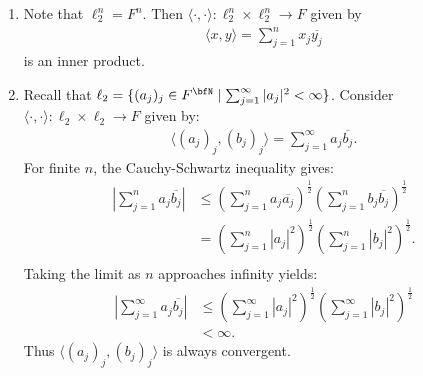     \begin{example}
        \phantom{a}
        \begin{enumerate}[label = (\arabic*)]
            \item Note that $\ell_2^n = F^n$. Then $\langle \cdot,\cdot \rangle: \ell_2^n \times \ell_2^n \rightarrow F$ given by
                \begin{equation*}
                \begin{split}
                    \langle x,y \rangle = \sum_{j = 1}^n x_j \overline{y_j}
                \end{split}
                \end{equation*}
            is an inner product.

            \item Recall that $\ell_2 = \{(a_j)_j \in F^\bfN \mid \sum_{j = 1}^\infty |a_j|^2 < \infty\}$. Consider $\langle \cdot,\cdot \rangle:\ell_2 \times \ell_2 \rightarrow F$ given by:
                \begin{equation*}
                \begin{split}
                    \langle (a_j)_j,(b_j)_j \rangle = \sum_{j = 1}^\infty a_j \overline{b_j}.
                \end{split}
                \end{equation*}
            For finite $n$, the Cauchy-Schwartz inequality gives:
                \begin{equation*}
                \begin{split}
                    \left| \sum_{j=1}^n a_j \overline{b_j} \right|
                    & \leq \left( \sum_{j = 1}^n a_j \overline{a_j} \right)^\frac{1}{2} \left( \sum_{j = 1}^n b_j \overline{b_j} \right)^\frac{1}{2} \\
                    & = \left( \sum_{j = 1}^n |a_j|^2 \right)^\frac{1}{2} \left( \sum_{j = 1}^n |b_j|^2 \right)^\frac{1}{2}. \\
                \end{split}
                \end{equation*}
            Taking the limit as $n$ approaches infinity yields:
                \begin{equation*}
                \begin{split}
                    \left| \sum_{j=1}^\infty a_j \overline{b_j} \right|
                    & \leq \left( \sum_{j = 1}^\infty |a_j|^2 \right)^\frac{1}{2} \left( \sum_{j = 1}^\infty |b_j|^2 \right)^\frac{1}{2} \\
                    & < \infty.
                \end{split}
                \end{equation*}
            Thus $\langle (a_j)_j,(b_j)_j \rangle$ is always convergent.
        \end{enumerate}
    \end{example}


    